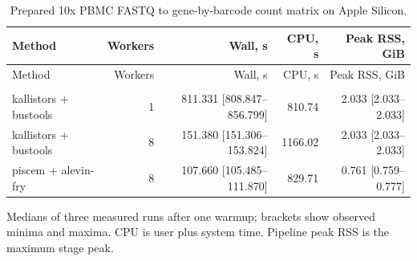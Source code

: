 \begingroup
\small
\setlength{\tabcolsep}{4pt}
\begin{longtable}{@{}lrrrr@{}}
\caption{Prepared 10x PBMC FASTQ to gene-by-barcode count matrix on Apple Silicon.}\label{tab:paper-single-cell}\\
\toprule
Method & Workers & Wall, s & CPU, s & Peak RSS, GiB \\
\midrule
\endfirsthead
\toprule
Method & Workers & Wall, s & CPU, s & Peak RSS, GiB \\
\midrule
\endhead
\bottomrule
\endfoot
\addlinespace
\multicolumn{5}{@{}l}{\textit{pbmc\_1k\_v3}} \\
kallistors + bustools & 1 & 811.331 [808.847--856.799] & 810.74 & 2.033 [2.033--2.033] \\
kallistors + bustools & 8 & 151.380 [151.306--153.824] & 1166.02 & 2.033 [2.033--2.033] \\
piscem + alevin-fry & 8 & 107.660 [105.485--111.870] & 829.71 & 0.761 [0.759--0.777] \\
\end{longtable}
\noindent\footnotesize Medians of three measured runs after one warmup; brackets show observed minima and maxima. CPU is user plus system time. Pipeline peak RSS is the maximum stage peak.
\endgroup
